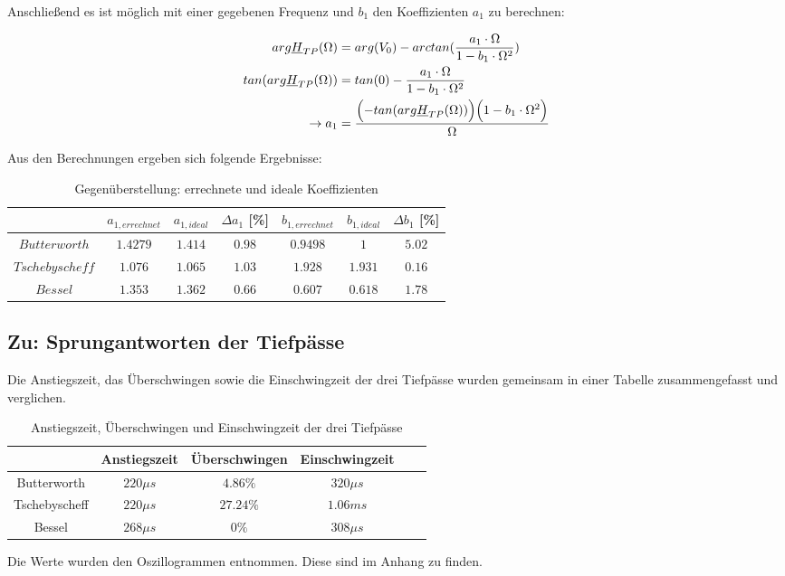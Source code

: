 \newpage

\noindent Anschließend es ist möglich mit einer gegebenen Frequenz und $b_1$ den Koeffizienten $a_1$ zu berechnen:

\small{
	\begin{alignat*}{2}
	arg\underline{H}_{TP}(\Omega) &= arg(V_0) - arctan(\frac{a_1 \cdot \Omega}{1-b_1\cdot \Omega^2}) \\
	tan(arg\underline{H}_{TP}(\Omega)) &= tan(0) - \frac{a_1 \cdot \Omega}{1-b_1\cdot \Omega^2}\\
	\rightarrow a_1 &= \frac{\Bigl(- tan(arg\underline{H}_{TP}(\Omega))\Bigr)\Bigl(1-b_1 \cdot \Omega^2\Bigr)}{\Omega}\\
	\end{alignat*}}

\noindent Aus den Berechnungen ergeben sich folgende Ergebnisse: \\

	\begin{table}[h]
		\centering
		\begin{tabular}{c|c|c|c||c|c|c}
			$ $             & $ a_{1, errechnet} $ & $ a_{1, ideal} $ & $\Delta a_1$ [\%] 
							& $b_{1, errechnet} $ & $ b_{1, ideal} $ & $\Delta b_1$ [\%] \\
			\hline	
			$Butterworth$   & $1.4279$             & $1.414$          & $0.98$            
			                & $0.9498$             & $1$              & $5.02$  \\ 	  	
			\hline
			$Tschebyscheff$ & $1.076$              & $1.065$          & $1.03$ 
			                & $1.928$              & $1.931$          & $0.16$  \\  
			\hline
			$ Bessel$ 		& $1.353$	           & $1.362$          & $0.66$  
			                & $0.607$              & $0.618$		  & $1.78$
		\end{tabular}
		\caption{Gegenüberstellung: errechnete und ideale Koeffizienten }
		\label{tab:koeffizienten}
	\end{table}
	
\newpage

\subsection{Zu: Sprungantworten der Tiefpässe}
\noindent Die Anstiegszeit, das Überschwingen sowie die Einschwingzeit der drei Tiefpässe wurden gemeinsam in einer Tabelle zusammengefasst und verglichen.

\begin{table}[h]
	\centering
	\begin{tabular}{c|c|c|c|c|c}
						& Anstiegszeit 	& Überschwingen	& Einschwingzeit  \\
		\hline
		Butterworth		& $220\mu s$	& $4.86\%$		& $320\mu s$ \\
		\hline
		Tschebyscheff	& $220\mu s$	& $27.24\%$		& $1.06ms$   \\
		\hline
		Bessel			& $268\mu s$	& $0\%$			& $308\mu s$ \\
	\end{tabular}
	\caption{Anstiegszeit, Überschwingen und Einschwingzeit der drei Tiefpässe}
	\label{tab:sprungantworten_tp}
\end{table}

\noindent Die Werte wurden den Oszillogrammen entnommen. Diese sind im Anhang zu finden.
\newpage
